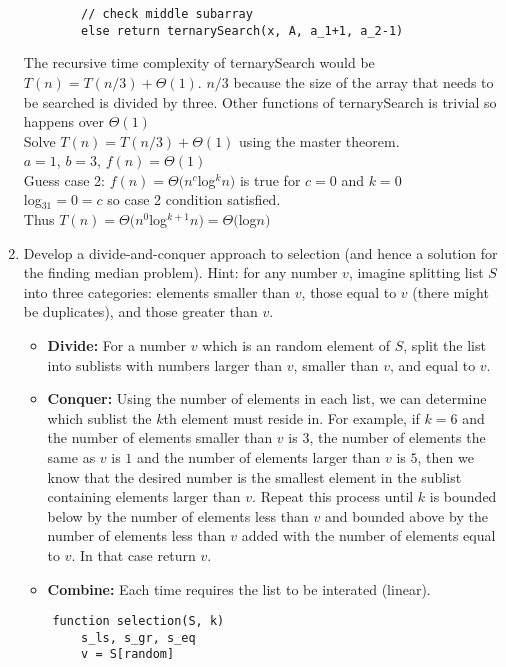 \documentclass{article}
\begin{document}
\begin{enumerate}
\begin{lstlisting}
        // check middle subarray
        else return ternarySearch(x, A, a_1+1, a_2-1)
            \end{lstlisting}
            The recursive time complexity of ternarySearch would be $T(n)=T(n/3)+\Theta(1)$. $n/3$ because the size of the array that needs to be searched is divided by three. Other functions of ternarySearch is trivial so happens over $\Theta(1)$\\
            Solve $T(n)=T(n/3)+\Theta(1)$ using the master theorem.\\
            $a = 1$, $b = 3$, $f(n) = \Theta(1)$\\
            Guess case 2: $f(n)=\Theta(n^c$log$^kn)$ is true for $c=0$ and $k=0$\\
            log$_31 =0= c$ so case 2 condition satisfied.\\
            Thus $T(n)=\Theta(n^0$log$^{k+1}n) = \Theta($log$n)$
        \item Develop a divide-and-conquer approach to selection (and hence a solution for the finding median problem). Hint: for any number $v$, imagine splitting list $S$ into three categories: elements smaller than $v$, those equal to $v$ (there might be duplicates), and those greater than $v$. 
            \begin{itemize}
                \item \textbf{Divide:} For a number $v$ which is an random element of $S$, split the list into sublists with numbers larger than $v$, smaller than $v$, and equal to $v$.
                \item \textbf{Conquer:} Using the number of elements in each list, we can determine which sublist the $k$th element must reside in. For example, if $k=6$ and the number of elements smaller than $v$ is $3$, the number of elements the same as $v$ is $1$ and the number of elements larger than $v$ is $5$, then we know that the desired number is the smallest element in the sublist containing elements larger than $v$. Repeat this process until $k$ is bounded below by the number of elements less than $v$ and bounded above by the number of elements less than $v$ added with the number of elements equal to $v$. In that case return $v$.
                \item \textbf{Combine:} Each time requires the list to be interated (linear).
            \end{itemize}
            \begin{lstlisting}
    function selection(S, k)
        s_ls, s_gr, s_eq
        v = S[random]

\end{lstlisting}
\end{enumerate}
\end{document}

